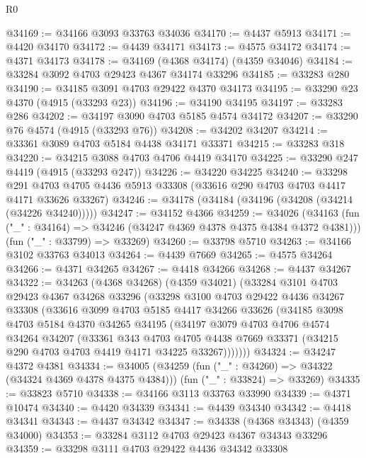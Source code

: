 \begin{lexlean}{R0}
\begin{coremodule}
@34169 := @34166 @3093 @33763 @34036
@34170 := @4437 @5913
@34171 := @4420 @34170
@34172 := @4439 @34171
@34173 := @4575 @34172
@34174 := @4371 @34173
@34178 := @34169 (@4368 @34174) (@4359 @34046)
@34184 := @33284 @3092 @4703 @29423 @4367 @34174 @33296
@34185 := @33283 @280
@34190 := @34185 @3091 @4703 @29422 @4370 @34173
@34195 := @33290 @23 @4370 (@4915 (@33293 @23))
@34196 := @34190 @34195
@34197 := @33283 @286
@34202 := @34197 @3090 @4703 @5185 @4574 @34172
@34207 := @33290 @76 @4574 (@4915 (@33293 @76))
@34208 := @34202 @34207
@34214 := @33361 @3089 @4703 @5184 @4438 @34171 @33371
@34215 := @33283 @318
@34220 := @34215 @3088 @4703 @4706 @4419 @34170
@34225 := @33290 @247 @4419 (@4915 (@33293 @247))
@34226 := @34220 @34225
@34240 := @33298
    @291
    @4703
    @4705
    @4436
    @5913
    @33308
    (@33616 @290 @4703 @4703 @4417 @4171 @33626 @33267)
@34246 := @34178 (@34184 (@34196 (@34208 (@34214 (@34226 @34240)))))
@34247 := @34152 @4366
@34259 := @34026
    (@34163 (fun ("_" : @34164) => @34246 (@34247 @4369 @4378 @4375 @4384 @4372 @4381)))
    (fun ("_" : @33799) => @33269)
@34260 := @33798 @5710
@34263 := @34166 @3102 @33763 @34013
@34264 := @4439 @7669
@34265 := @4575 @34264
@34266 := @4371 @34265
@34267 := @4418 @34266
@34268 := @4437 @34267
@34322 := @34263
    (@4368 @34268)
    (@4359 @34021)
    (@33284
      @3101
      @4703
      @29423
      @4367
      @34268
      @33296
      (@33298
        @3100
        @4703
        @29422
        @4436
        @34267
        @33308
        (@33616
          @3099
          @4703
          @5185
          @4417
          @34266
          @33626
          (@34185
            @3098
            @4703
            @5184
            @4370
            @34265
            @34195
            (@34197
              @3079
              @4703
              @4706
              @4574
              @34264
              @34207
              (@33361
                @343
                @4703
                @4705
                @4438
                @7669
                @33371
                (@34215 @290 @4703 @4703 @4419 @4171 @34225 @33267)))))))
@34324 := @34247 @4372 @4381
@34334 := @34005
    (@34259 (fun ("_" : @34260) => @34322 (@34324 @4369 @4378 @4375 @4384)))
    (fun ("_" : @33824) => @33269)
@34335 := @33823 @5710
@34338 := @34166 @3113 @33763 @33990
@34339 := @4371 @10474
@34340 := @4420 @34339
@34341 := @4439 @34340
@34342 := @4418 @34341
@34343 := @4437 @34342
@34347 := @34338 (@4368 @34343) (@4359 @34000)
@34353 := @33284 @3112 @4703 @29423 @4367 @34343 @33296
@34359 := @33298 @3111 @4703 @29422 @4436 @34342 @33308

\end{coremodule}
\end{lexlean}
